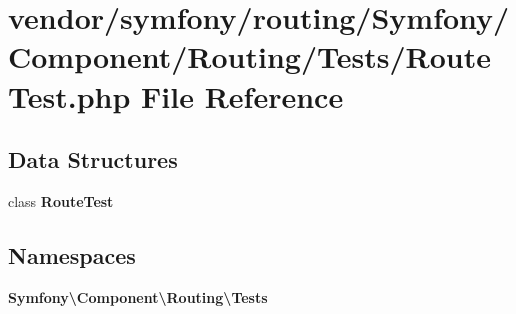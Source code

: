 \section{vendor/symfony/routing/\+Symfony/\+Component/\+Routing/\+Tests/\+Route\+Test.php File Reference}
\label{_route_test_8php}
\subsection*{Data Structures}
\begin{DoxyCompactItemize}
\item 
class {\bf Route\+Test}
\end{DoxyCompactItemize}
\subsection*{Namespaces}
\begin{DoxyCompactItemize}
\item 
 {\bf Symfony\textbackslash{}\+Component\textbackslash{}\+Routing\textbackslash{}\+Tests}
\end{DoxyCompactItemize}
